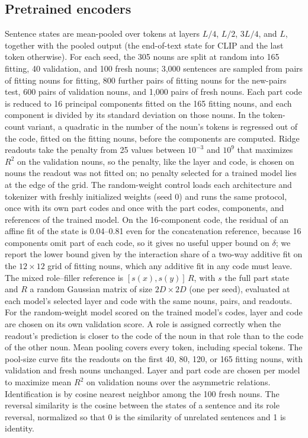 \documentclass[10pt]{article}
\theoremstyle{plain}
\theoremstyle{remark}
\begin{document}
\subsection{Pretrained encoders}
Sentence states are mean-pooled over tokens at layers $L/4$, $L/2$, $3L/4$, and $L$, together with the pooled output (the end-of-text state for CLIP and the last token otherwise). For each seed, the 305 nouns are split at random into 165 fitting, 40 validation, and 100 fresh nouns; 3{,}000 sentences are sampled from pairs of fitting nouns for fitting, 800 further pairs of fitting nouns for the new-pairs test, 600 pairs of validation nouns, and 1{,}000 pairs of fresh nouns. Each part code is reduced to 16 principal components fitted on the 165 fitting nouns, and each component is divided by its standard deviation on those nouns. In the token-count variant, a quadratic in the number of the noun's tokens is regressed out of the code, fitted on the fitting nouns, before the components are computed. Ridge readouts take the penalty from 25 values between $10^{-3}$ and $10^{9}$ that maximizes $R^2$ on the validation nouns, so the penalty, like the layer and code, is chosen on nouns the readout was not fitted on; no penalty selected for a trained model lies at the edge of the grid. The random-weight control loads each architecture and tokenizer with freshly initialized weights (seed 0) and runs the same protocol, once with its own part codes and once with the part codes, components, and references of the trained model. On the 16-component code, the residual of an affine fit of the state is 0.04--0.81 even for the concatenation reference, because 16 components omit part of each code, so it gives no useful upper bound on $\delta$; we report the lower bound given by the interaction share of a two-way additive fit on the $12 \times 12$ grid of fitting nouns, which any additive fit in any code must leave. The mixed role--filler reference is $[s(x), s(y)]\,R$, with $s$ the full part state and $R$ a random Gaussian matrix of size $2D \times 2D$ (one per seed), evaluated at each model's selected layer and code with the same nouns, pairs, and readouts. For the random-weight model scored on the trained model's codes, layer and code are chosen on its own validation score. A role is assigned correctly when the readout's prediction is closer to the code of the noun in that role than to the code of the other noun. Mean pooling covers every token, including special tokens. The pool-size curve fits the readouts on the first 40, 80, 120, or 165 fitting nouns, with validation and fresh nouns unchanged. Layer and part code are chosen per model to maximize mean $R^2$ on validation nouns over the asymmetric relations. Identification is by cosine nearest neighbor among the 100 fresh nouns. The reversal similarity is the cosine between the states of a sentence and its role reversal, normalized so that 0 is the similarity of unrelated sentences and 1 is identity.
\end{document}
